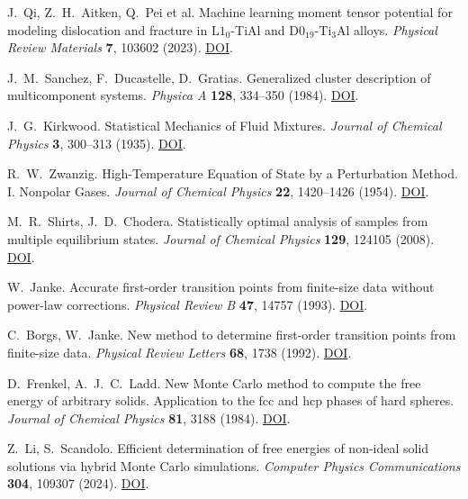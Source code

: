 J.~Qi, Z.~H.~Aitken, Q.~Pei et al.
Machine learning moment tensor potential for modeling dislocation and fracture
in \(\mathrm{L1}_0\)-TiAl and \(\mathrm{D0}_{19}\)-\(\mathrm{Ti}_3\mathrm{Al}\) alloys.
\emph{Physical Review Materials} \textbf{7}, 103602 (2023).
\href{https://doi.org/10.1103/PhysRevMaterials.7.103602}{DOI}.

J.~M.~Sanchez, F.~Ducastelle, D.~Gratias.
Generalized cluster description of multicomponent systems.
\emph{Physica A} \textbf{128}, 334--350 (1984).
\href{https://doi.org/10.1016/0378-4371(84)90096-7}{DOI}.

J.~G.~Kirkwood. Statistical Mechanics of Fluid Mixtures.
\emph{Journal of Chemical Physics} \textbf{3}, 300--313 (1935).
\href{https://doi.org/10.1063/1.1749657}{DOI}.

R.~W.~Zwanzig. High-Temperature Equation of State by a Perturbation Method.
I. Nonpolar Gases. \emph{Journal of Chemical Physics} \textbf{22}, 1420--1426 (1954).
\href{https://doi.org/10.1063/1.1740409}{DOI}.

M.~R.~Shirts, J.~D.~Chodera.
Statistically optimal analysis of samples from multiple equilibrium states.
\emph{Journal of Chemical Physics} \textbf{129}, 124105 (2008).
\href{https://doi.org/10.1063/1.2978177}{DOI}.

W.~Janke.
Accurate first-order transition points from finite-size data without power-law corrections.
\emph{Physical Review B} \textbf{47}, 14757 (1993).
\href{https://doi.org/10.1103/PhysRevB.47.14757}{DOI}.

C.~Borgs, W.~Janke.
New method to determine first-order transition points from finite-size data.
\emph{Physical Review Letters} \textbf{68}, 1738 (1992).
\href{https://doi.org/10.1103/PhysRevLett.68.1738}{DOI}.

D.~Frenkel, A.~J.~C.~Ladd.
New Monte Carlo method to compute the free energy of arbitrary solids.
Application to the fcc and hcp phases of hard spheres.
\emph{Journal of Chemical Physics} \textbf{81}, 3188 (1984).
\href{https://doi.org/10.1063/1.448024}{DOI}.

Z.~Li, S.~Scandolo.
Efficient determination of free energies of non-ideal solid solutions via hybrid
Monte Carlo simulations.
\emph{Computer Physics Communications} \textbf{304}, 109307 (2024).
\href{https://doi.org/10.1016/j.cpc.2024.109307}{DOI}.

